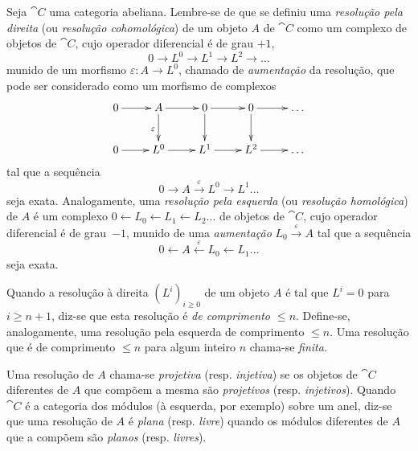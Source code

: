 \begin{env}[11.4.1]
\label{0.11.4.1}
Seja $\cat{C}$ uma categoria abeliana.
Lembre-se de que se definiu uma \emph{resolução pela direita} (ou \emph{resolução cohomológica}) de um objeto $A$ de $\cat{C}$ como um complexo de objetos de $\cat{C}$, cujo operador diferencial é de grau $+1$,
\[
  0 \rightarrow L^0 \rightarrow L^1 \rightarrow L^2 \rightarrow \ldots
\]
munido de um morfismo $\varepsilon: A \rightarrow L^0$, chamado de \emph{aumentação} da resolução, que pode ser considerado como um morfismo de complexos
\[
  \xymatrix{
    0 \ar[r]
    & A \ar[r] \ar[d]_{\varepsilon}
    & 0 \ar[r] \ar[d]
    & 0 \ar[r] \ar[d]
    & \ldots
  \\0 \ar[r]
    & L^0 \ar[r]
    & L^1 \ar[r]
    & L^2 \ar[r]
    & \ldots
  }
\]
tal que a sequência
\[
  0 \rightarrow A \xrightarrow{\varepsilon} L^0 \rightarrow L^1 \ldots
\]
seja exata.
Analogamente, uma \emph{resolução pela esquerda} (ou \emph{resolução homológica}) de $A$ é um complexo $0 \leftarrow L_0 \leftarrow L_1 \leftarrow L_2 \ldots$ de objetos de $\cat{C}$, cujo operador diferencial é de grau~$-1$, munido de uma \emph{aumentação} $L_0 \xrightarrow{\varepsilon} A$ tal que a sequência
\[
  0 \leftarrow A \xleftarrow{\varepsilon} L_0 \leftarrow L_1 \ldots
\]
seja exata.

Quando a resolução à direita $(L^i)_{i\geq 0}$ de um objeto $A$ é tal que $L^i=0$ para $i\geq n+1$, diz-se que esta resolução é \emph{de comprimento $\leq n$}.
Define-se, analogamente, uma resolução pela esquerda de comprimento $\leq n$.
Uma resolução que é de comprimento $\leq n$ para algum inteiro $n$ chama-se \emph{finita}.

Uma resolução de $A$ chama-se \emph{projetiva} (resp. \emph{injetiva}) se os objetos de $\cat{C}$ diferentes de $A$ que compõem a mesma são \emph{projetivos} (resp. \emph{injetivos}).
Quando $\cat{C}$ é a categoria dos módulos (à esquerda, por exemplo) sobre um anel, diz-se que uma resolução de $A$ é \emph{plana} (resp. \emph{livre}) quando os módulos diferentes de $A$ que a compõem são \emph{planos} (resp. \emph{livres}).
\end{env}

